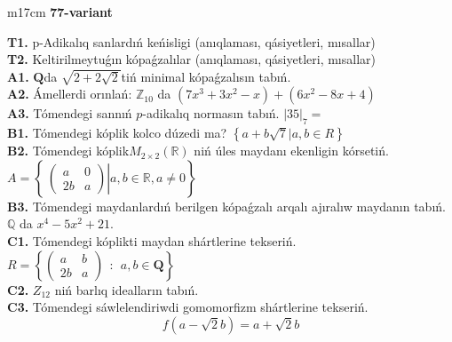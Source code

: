 \documentclass{article}
\begin{document}
\begin{tabular}{m{17cm}}
\textbf{77-variant}
\newline

\textbf{T1.} p-Adikalıq sanlardıń keńisligi (anıqlaması, qásiyetleri, mısallar) \\
\textbf{T2.} Keltirilmeytuǵın kópaǵzalılar (anıqlaması, qásiyetleri, mısallar) \\
\textbf{A1.} \(\mathbf{Q}\)da \(\sqrt{2 + 2\sqrt{2}}\)tiń minimal kópaǵzalısın tabıń. \\
\textbf{A2.} Ámellerdi orınlań: \(\mathbb{Z}_{10}\) da \(\left( 7x^{3} + 3x^{2} - x \right) + \left( 6x^{2} - 8x + 4 \right)\) \\
\textbf{A3.} Tómendegi sannıń \(p\)-adikalıq normasın tabıń. \(|35|_{7} =\) \\
\textbf{B1.} Tómendegi kóplik kolco dúzedi ma? \(\left\{ a + b\sqrt{7}|a,b \in R \right\}\) \\
\textbf{B2.} Tómendegi kóplik\(M_{2 \times 2}\left( \mathbb{R} \right)\) niń úles maydanı ekenligin kórsetiń. \(A = \left\{ \left. \ \begin{pmatrix}
a & 0 \\
2b & a
\end{pmatrix} \right|a,b\mathbb{\in R},a \neq 0 \right\}\) \\
\textbf{B3.} Tómendegi maydanlardıń berilgen kópaǵzalı arqalı ajıralıw maydanın tabıń.
\(\mathbb{Q}\) da \(x^{4} - 5x^{2} + 21\). \\
\textbf{C1.} Tómendegi kóplikti maydan shártlerine tekseriń. \(R = \left\{ \begin{pmatrix}
a & b \\
2b & a
\end{pmatrix}\ \ :\ \ a,b \in \mathbf{Q} \right\}\) \\
\textbf{C2.} \(Z_{12}\) niń barlıq idealların tabıń. \\
\textbf{C3.} Tómendegi sáwlelendiriwdi gomomorfizm shártlerine tekseriń.
\[f\left( a - \sqrt{2}b \right) = a + \sqrt{2}b\] \\

\end{tabular}
\vspace{1cm}
\end{document}
